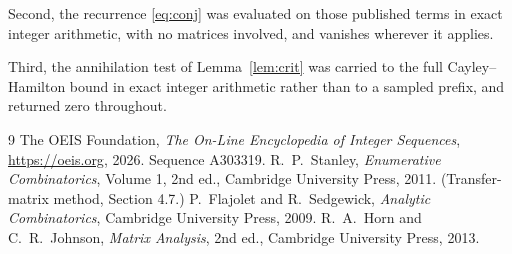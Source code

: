 \documentclass[11pt,a4paper]{article}
\theoremstyle{plain}
\theoremstyle{definition}
\begin{document}
Second, the recurrence \eqref{eq:conj} was evaluated on those published terms in exact
integer arithmetic, with no matrices involved, and vanishes wherever it applies.

Third, the annihilation test of Lemma~\ref{lem:crit} was carried to the full
Cayley--Hamilton bound in exact integer arithmetic rather than to a sampled prefix, and
returned zero throughout.

\begin{thebibliography}{9}
 The OEIS Foundation, \emph{The On-Line Encyclopedia of Integer
Sequences}, \url{https://oeis.org}, 2026. Sequence A303319.
 R.~P.~Stanley, \emph{Enumerative Combinatorics}, Volume 1, 2nd ed.,
Cambridge University Press, 2011. (Transfer-matrix method, Section 4.7.)
 P.~Flajolet and R.~Sedgewick, \emph{Analytic Combinatorics}, Cambridge
University Press, 2009.
 R.~A.~Horn and C.~R.~Johnson, \emph{Matrix Analysis}, 2nd ed., Cambridge
University Press, 2013.
\end{thebibliography}
\end{document}
